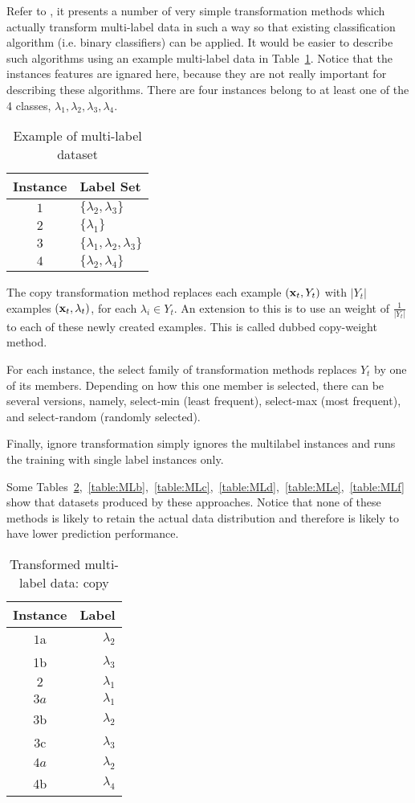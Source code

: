 Refer to \cite{sorower2010literature}, it presents a number of very simple transformation methods which actually transform multi-label data in such a way so that existing classification algorithm (i.e. binary classifiers) can be applied. It would be easier to describe such algorithms using an example multi-label data in Table~\ref{table:multilabel}. Notice that the instances features are ignared here, because they are not really important for describing these algorithms. There are four instances belong to at least one of the 4 classes, $\lambda_1, \lambda_2, \lambda_3, \lambda_4$.
\begin{table}[!htb]
\centering
\caption{Example of multi-label dataset}
\label{table:multilabel}
\begin{tabular}{c|l}
\toprule
Instance & Label Set \\
\hline
$1$ & $\{\lambda_2,\lambda_3\}$ \\
$2$ & $\{\lambda_1\}$ \\
$3$ & $\{ \lambda_1,\lambda_2,\lambda_3\}$ \\
$4$ & $\{\lambda_2,\lambda_4\}$\\
\bottomrule
\end{tabular}
\end{table}

The copy transformation method replaces each example $(\mathbf{x}_t, Y_t)$ with $|Y_t|$ examples $(\mathbf{x}_t,\lambda_t)$, for each $\lambda_i\in Y_t$. An extension to this is to use an weight of $\frac{1}{|Y_t|}$ to each of these newly created examples. This is called dubbed copy-weight method.

For each instance, the select family of transformation methods replaces $Y_t$ by one of its members. Depending on how this one member is selected, there can be several versions, namely, select-min (least frequent), select-max (most frequent), and select-random (randomly selected). 

Finally, ignore transformation simply ignores the multilabel instances and runs the training with single label instances only. 

\iffalse
Some Tables~\ref{table:MLa},~\ref{table:MLb},~\ref{table:MLc},~\ref{table:MLd},~\ref{table:MLe},~\ref{table:MLf} show that datasets produced by these approaches. Notice that none of these methods is likely to retain the actual data distribution and therefore is likely to have lower prediction performance.
\begin{table}[!htb]
\centering
\caption{Transformed multi-label data: copy}
\label{table:MLa}
\begin{tabular}{c|r}
\toprule
Instance & Label \\
\hline
$1$a & $\lambda_2$ \\
1b & $\lambda_3$ \\
$2$ & $\lambda_1$ \\
$3a$ & $ \lambda_1$ \\
3b & $\lambda_2$ \\
3c & $\lambda_3$\\
$4a$ & $\lambda_2$\\
4b & $\lambda_4$\\
\bottomrule
\end{tabular}
\end{table}

